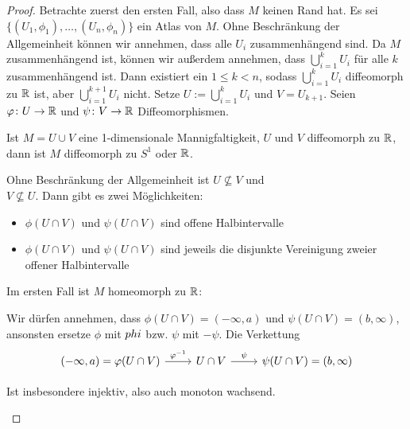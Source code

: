 \begin{proof}
    Betrachte zuerst den ersten Fall, also dass $M$ keinen Rand hat. Es sei 
    $\{ (U_1, \phi_1), \dots, (U_n, \phi_n) \}$ ein Atlas von $M$. Ohne Beschränkung der 
    Allgemeinheit können wir annehmen, dass alle $U_i$ zusammenhängend sind. 
    Da $M$ zusammenhängend ist, können wir außerdem annehmen, dass 
    $\bigcup_{i = 1}^k U_i$ für alle $k$ zusammenhängend ist. Dann existiert ein $1 \leq k < n$, 
    sodass $\bigcup_{i = 1}^k U_i$ diffeomorph zu ${ \mathbb R }$ ist, aber $\bigcup_{i = 1}^{k + 1} U_i$ 
    nicht. Setze $U := \bigcup_{i = 1}^k U_i$ und $V = U_{k + 1}$. Seien $\varphi \colon U \to { \mathbb R }$
    und $\psi \colon V \to { \mathbb R }$ Diffeomorphismen. 
    \begin{claim*}
        Ist $M = U \cup V$ eine 1-dimensionale Mannigfaltigkeit, $U$ und $V$ diffeomorph zu 
        ${ \mathbb R }$, dann ist $M$ diffeomorph zu $S^1$ oder ${ \mathbb R }$.
    \end{claim*}

    \begin{smallproof}
        Ohne Beschränkung der Allgemeinheit ist $U \not\subseteq V$ und \\ 
        $V \not\subseteq U$. Dann gibt es zwei Möglichkeiten:
        \begin{itemize}
            \item $\phi(U \cap V)$ und $\psi(U \cap V)$ sind offene Halbintervalle
            \item $\phi(U \cap V)$ und $\psi(U \cap V)$ sind jeweils die disjunkte Vereinigung
                zweier offener Halbintervalle
        \end{itemize}
        Im ersten Fall ist $M$ homeomorph zu ${ \mathbb R }$:

        Wir dürfen annehmen, dass $\phi(U \cap V) = (- \infty, a)$ und $\psi(U \cap V) = (b, \infty)$,
        ansonsten ersetze $\phi$ mit $\-phi$ bzw. $\psi$ mit $-\psi$. Die Verkettung
        \[ \begin{tikzcd}
            (- \infty, a) = \phi(U \cap V) \arrow[r, "\phi^{-1}"] & 
                U \cap V \arrow[r, "\psi"] & 
                \psi(U \cap V) = (b, \infty)
        \end{tikzcd} \] 
        
        Ist insbesondere injektiv, also auch monoton wachsend. 
        \todo{}
    \end{smallproof}
\end{proof}
